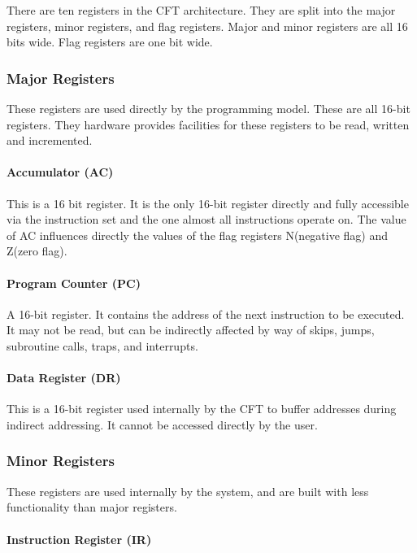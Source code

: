 \documentclass[11pt,a4paper,twocolumns]{article}
\newcommand\register[1]{\textsf{#1}}
\newcommand\A{\register{AC}}
\newcommand\Zreg{\register{Z}}
\newcommand\Nreg{\register{N}}
\newcommand\DR{\register{DR}}
\newcommand\PC{\register{PC}}
\newcommand\IR{\register{IR}}
\begin{document}
There are ten registers in the CFT architecture. They are split into
the major registers, minor registers, and flag registers. Major and
minor registers are all 16 bits wide. Flag registers are one bit wide.

\subsubsection{Major Registers}

These registers are used directly by the programming model. These are
all 16-bit registers. They hardware provides facilities for these
registers to be read, written and incremented.

\paragraph{Accumulator (\A)}

This is a 16 bit register. It is the only 16-bit register directly and
fully accessible via the instruction set and the one almost all
instructions operate on. The value of \A{} influences directly the
values of the flag registers \Nreg (negative flag) and \Zreg (zero
flag).

\paragraph{Program Counter (\PC)}

A 16-bit register. It contains the address of the next instruction to
be executed. It may not be read, but can be indirectly affected by way
of skips, jumps, subroutine calls, traps, and interrupts.

\paragraph{Data Register (\DR)}

This is a 16-bit register used internally by the CFT to buffer
addresses during indirect addressing. It cannot be accessed directly
by the user.



\subsubsection{Minor Registers}

These registers are used internally by the system, and are built with
less functionality than major registers.

\paragraph{Instruction Register (\IR)}
\end{document}
